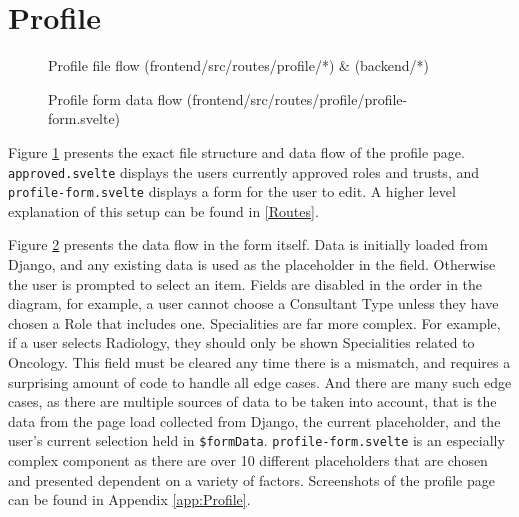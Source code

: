 \section{Profile}
\begin{figure}[h]
\centering
{}
\vspace{-20pt}
\caption{Profile file flow (frontend/src/routes/profile/*) \& (backend/*)}
\label{fig:profile-file-flow}
\vspace{-5pt}
\end{figure}


\begin{figure}[h]
\centering
{}
\vspace{-5pt}
\caption{Profile form data flow (frontend/src/routes/profile/profile-form.svelte)}
\label{fig:profile-form}
\vspace{-5pt}
\end{figure}

Figure \ref{fig:profile-file-flow} presents the exact file structure and data flow of the profile page. \texttt{approved.svelte} displays the users currently approved roles and trusts, and \texttt{profile-form.svelte} displays a form for the user to edit. A higher level explanation of this setup can be found in \ref{Routes}. 

Figure \ref{fig:profile-form} presents the data flow in the form itself. Data is initially loaded from Django, and any existing data is used as the placeholder in the field. Otherwise the user is prompted to select an item. Fields are disabled in the order in the diagram, for example, a user cannot choose a Consultant Type unless they have chosen a Role that includes one. Specialities are far more complex. For example, if a user selects Radiology, they should only be shown Specialities related to Oncology. This field must be cleared any time there is a mismatch, and requires a surprising amount of code to handle all edge cases. And there are many such edge cases, as there are multiple sources of data to be taken into account, that is the data from the page load collected from Django, the current placeholder, and the user's current selection held in \texttt{\$formData}. \texttt{profile-form.svelte} is an especially complex component as there are over 10 different placeholders that are chosen and presented dependent on a variety of factors. Screenshots of the profile page can be found in Appendix \ref{app:Profile}.

